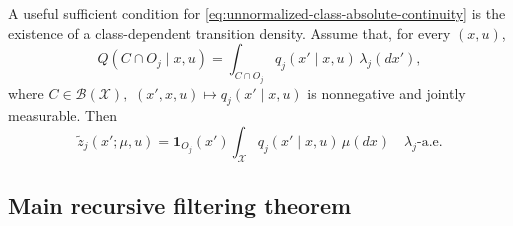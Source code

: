 \documentclass[10pt,twocolumn]{article}
\theoremstyle{remark}
\newcommand{\B}{\mathcal{B}}
\newcommand{\Xcal}{\mathcal{X}}
\newcommand{\one}{\mathbf{1}}
\begin{document}
A useful sufficient condition for \cref{eq:unnormalized-class-absolute-continuity} is the existence of a class-dependent transition density. Assume that, for every \((x,u)\),
\begin{equation}
	Q(C\cap O_j\mid x,u)
	=
	\int_{C\cap O_j}q_j(x'\mid x,u)\,\lambda_j(dx'),
	\label{eq:class-transition-density}
\end{equation}
where \(C\in\B(\Xcal),\) \((x',x,u)\mapsto q_j(x'\mid x,u)\) is nonnegative and jointly measurable. Then
\begin{equation}
	\widetilde z_j(x';\mu,u)
	=
	\one_{O_j}(x')
	\int_{\Xcal}q_j(x'\mid x,u)\,\mu(dx)
	\quad \lambda_j\text{-a.e.}
	\label{eq:explicit-unnormalized-density}
\end{equation}

\subsection{Main recursive filtering theorem}
\label{subsec:main-filtering-theorem}
\end{document}

